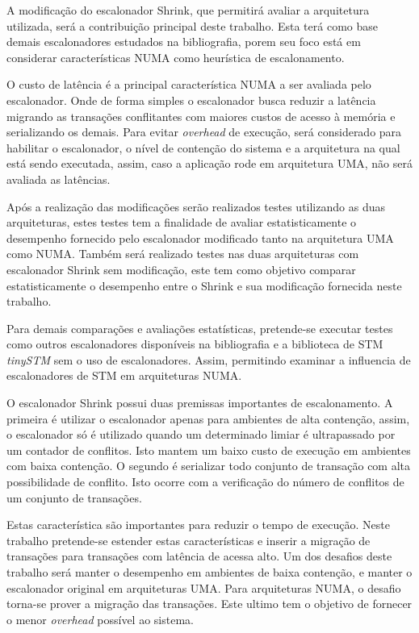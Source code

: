 \documentclass[diss-proposta,nocipinfo]{texufpel}
\begin{document}
A modificação do escalonador Shrink, que permitirá avaliar a arquitetura utilizada, será a contribuição principal deste trabalho. Esta terá como base demais escalonadores estudados na bibliografia, porem seu foco está em considerar características NUMA como heurística de escalonamento.

O custo de latência é a principal característica NUMA a ser avaliada pelo escalonador. Onde de forma simples o escalonador busca reduzir a latência migrando as transações conflitantes com maiores custos de acesso à memória e serializando os demais. Para evitar \emph{overhead} de execução, será considerado para habilitar o escalonador, o nível de contenção do sistema e a arquitetura na qual está sendo executada, assim, caso a aplicação rode em arquitetura UMA, não será avaliada as latências.

Após a realização das modificações serão realizados testes utilizando as duas arquiteturas, estes testes tem a finalidade de avaliar estatisticamente o desempenho fornecido pelo escalonador modificado tanto na arquitetura UMA como NUMA. Também será realizado testes nas duas arquiteturas com escalonador Shrink sem modificação, este tem como objetivo comparar estatisticamente o desempenho entre o Shrink e sua modificação fornecida neste trabalho.

Para demais comparações e avaliações estatísticas, pretende-se executar testes como outros escalonadores disponíveis na bibliografia e a biblioteca de STM \emph{tinySTM} sem o uso de escalonadores. Assim, permitindo examinar a influencia de escalonadores de STM em arquiteturas NUMA.

O escalonador Shrink possui duas premissas importantes de escalonamento. A primeira é utilizar o escalonador apenas para ambientes de alta contenção, assim, o escalonador só é utilizado quando um determinado limiar é ultrapassado por um contador de conflitos. Isto mantem um baixo custo de execução em ambientes com baixa contenção. O segundo é serializar todo conjunto de transação com alta possibilidade de conflito. Isto ocorre com a verificação do número de conflitos de um conjunto de transações.

Estas característica são importantes para reduzir o tempo de execução. Neste trabalho pretende-se estender estas características e inserir a migração de transações para transações com latência de acessa alto. Um dos desafios deste trabalho será manter o desempenho em ambientes de baixa contenção, e manter o escalonador original em arquiteturas UMA. Para arquiteturas NUMA, o desafio torna-se prover a migração das transações. Este ultimo tem o objetivo de fornecer o menor \emph{overhead} possível ao sistema.
\end{document}
